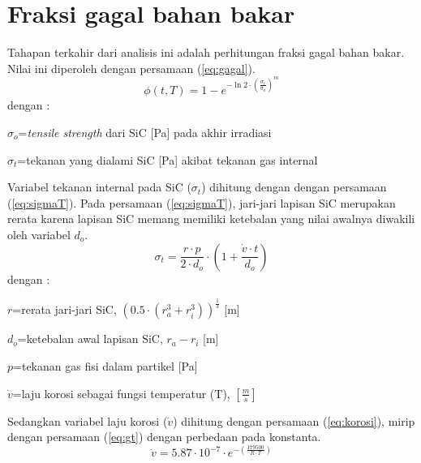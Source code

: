 \documentclass[a4paper,11pt]{report}
\begin{document}
\section{Fraksi gagal bahan bakar}
Tahapan terkahir dari analisis ini adalah perhitungan fraksi gagal bahan bakar. Nilai ini diperoleh dengan persamaan (\ref{eq:gagal}).
\begin{equation}
  \phi(t,T)=1-e^{-\ln 2 \cdot \left(\frac{\sigma_t}{\sigma_o}\right)^m}
  \label{eq:gagal}
\end{equation}
dengan :
\begin{description}
  \item $\sigma_o$=\textit{tensile strength} dari SiC [Pa] pada akhir irradiasi
  \item $\sigma_t$=tekanan yang dialami SiC [Pa] akibat tekanan gas internal
\end{description}

Variabel tekanan internal pada SiC ($\sigma_t$) dihitung dengan dengan persamaan (\ref{eq:sigmaT}). Pada persamaan (\ref{eq:sigmaT}), jari-jari lapisan SiC merupakan rerata karena lapisan SiC memang memiliki ketebalan yang nilai awalnya diwakili oleh variabel $d_o$.
\begin{equation}
  \sigma_t =\frac{r \cdot p}{2 \cdot d_o} \cdot \left( 1+\frac{\dot{v} \cdot t}{d_o} \right)
  \label{eq:sigmaT}
\end{equation}
dengan :
\begin{description}
  \item $r$=rerata jari-jari SiC, $\left( 0.5 \cdot \left( r_a^3 + r_i^3 \right)\right)^{\frac{1}{3}}$ [m]
  \item $d_o$=ketebalan awal lapisan SiC, $r_a - r_i$ [m]
  \item $p$=tekanan gas fisi dalam partikel [Pa]
  \item $\dot{v}$=laju korosi sebagai fungsi temperatur (T), $\left[\frac{m}{s}\right]$
\end{description}

Sedangkan variabel laju korosi ($\dot{v}$) dihitung dengan persamaan (\ref{eq:korosi}), mirip dengan persamaan (\ref{eq:gt}) dengan perbedaan pada konstanta.
\begin{equation}
  \dot{v}=5.87 \cdot 10^{-7} \cdot e^{-\left( \frac{179500}{R \cdot T}\right)}
  \label{eq:korosi}
\end{equation}




\begin{appendix}
	
	\setcounter{page}{2}
	
\end{appendix}
\end{document}
